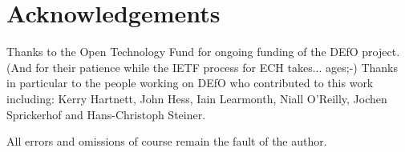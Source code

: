 \section*{Acknowledgements}

Thanks to the Open Technology Fund for ongoing funding of the DEfO
project. (And for their patience while the IETF process for ECH takes...
ages;-)
Thanks in particular to the people working on DEfO who contributed to this work
including:
Kerry Hartnett,
John Hess,
Iain Learmonth,
Niall O'Reilly,
Jochen Sprickerhof
and Hans-Christoph Steiner.

All errors and omissions of course remain the fault of the author.
